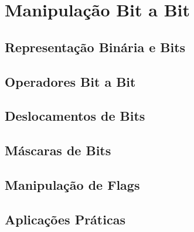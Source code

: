 \chapter{Manipulação Bit a Bit}

\section{Representação Binária e Bits}

\section{Operadores Bit a Bit}

\section{Deslocamentos de Bits}

\section{Máscaras de Bits}

\section{Manipulação de Flags}

\section{Aplicações Práticas}
